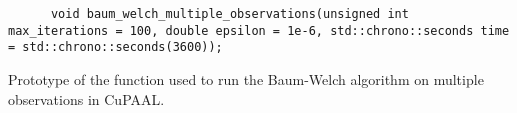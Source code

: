 \begin{listing*}
      \begin{verbatim}
      void baum_welch_multiple_observations(unsigned int max_iterations = 100, double epsilon = 1e-6, std::chrono::seconds time = std::chrono::seconds(3600));
      \end{verbatim}
      \caption{Prototype of the function used to run the Baum-Welch algorithm on multiple observations in CuPAAL.}
      \label{lst:baum-welch-multiple-observations}
\end{listing*}